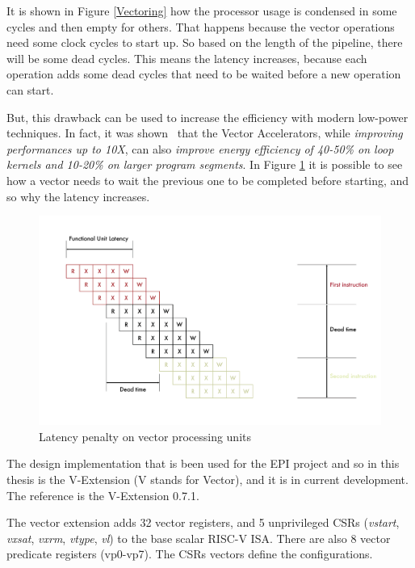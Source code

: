 It is shown in Figure \ref{Vectoring} how the processor usage is condensed in some cycles and then empty for others. That happens because the vector operations need some clock cycles to start up. So based on the length of the pipeline, there will be some dead cycles.
This means the latency increases, because each operation adds some dead cycles that need to be waited before a new operation can start.

But, this drawback can be used to increase the efficiency with modern low-power techniques. In fact, it was shown~\cite{Lemuet2006} that the Vector Accelerators, while \emph{improving performances up to 10X}, can also \emph{improve energy efficiency of \mbox{40-50\%} on loop kernels and \mbox{10-20\%} on larger program segments}.
In Figure \ref{Vector-Latency} it is possible to see how a vector needs to wait the previous one to be completed before starting, and so why the latency increases. 

\begin{figure}[H]
    \centering
    \includegraphics[scale = 0.5]{Chapter_1/img/lat-pen.png}
    \caption{Latency penalty on vector processing units \cite{L15-Krste}}
    \label{Vector-Latency}
\end{figure}


The design implementation that is been used for the EPI project and so in this thesis is the V-Extension (V stands for Vector), and it is in current development. The reference is the V-Extension 0.7.1.

The vector extension adds 32 vector registers, and 5 unprivileged CSRs (\emph{vstart}, \emph{vxsat}, \emph{vxrm}, \emph{vtype}, \emph{vl}) to the base scalar \mbox{RISC-V} ISA\cite{riscv-v-specs}.
There are also 8 vector predicate registers (vp0-vp7). The CSRs vectors define the configurations.

